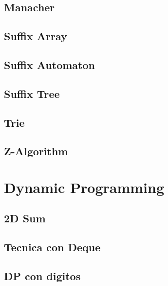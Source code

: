\subsection{Manacher}
\raggedbottom
\hrulefill
\subsection{Suffix Array}
\raggedbottom
\hrulefill
\subsection{Suffix Automaton}
\raggedbottom
\hrulefill
\subsection{Suffix Tree}
\raggedbottom
\hrulefill
\subsection{Trie}
\raggedbottom
\hrulefill
\subsection{Z-Algorithm}
\raggedbottom
\hrulefill
\newpage

\section{Dynamic Programming}
\subsection{2D Sum}
\raggedbottom
\hrulefill
\subsection{Tecnica con Deque}
\raggedbottom
\hrulefill
\subsection{DP con digitos}
\raggedbottom
\hrulefill

